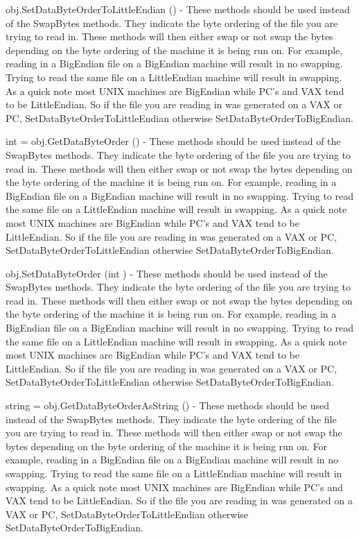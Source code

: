 \begin{DoxyItemize}
\item {\ttfamily obj.\-Set\-Data\-Byte\-Order\-To\-Little\-Endian ()} -\/ These methods should be used instead of the Swap\-Bytes methods. They indicate the byte ordering of the file you are trying to read in. These methods will then either swap or not swap the bytes depending on the byte ordering of the machine it is being run on. For example, reading in a Big\-Endian file on a Big\-Endian machine will result in no swapping. Trying to read the same file on a Little\-Endian machine will result in swapping. As a quick note most U\-N\-I\-X machines are Big\-Endian while P\-C's and V\-A\-X tend to be Little\-Endian. So if the file you are reading in was generated on a V\-A\-X or P\-C, Set\-Data\-Byte\-Order\-To\-Little\-Endian otherwise Set\-Data\-Byte\-Order\-To\-Big\-Endian.  
\item {\ttfamily int = obj.\-Get\-Data\-Byte\-Order ()} -\/ These methods should be used instead of the Swap\-Bytes methods. They indicate the byte ordering of the file you are trying to read in. These methods will then either swap or not swap the bytes depending on the byte ordering of the machine it is being run on. For example, reading in a Big\-Endian file on a Big\-Endian machine will result in no swapping. Trying to read the same file on a Little\-Endian machine will result in swapping. As a quick note most U\-N\-I\-X machines are Big\-Endian while P\-C's and V\-A\-X tend to be Little\-Endian. So if the file you are reading in was generated on a V\-A\-X or P\-C, Set\-Data\-Byte\-Order\-To\-Little\-Endian otherwise Set\-Data\-Byte\-Order\-To\-Big\-Endian.  
\item {\ttfamily obj.\-Set\-Data\-Byte\-Order (int )} -\/ These methods should be used instead of the Swap\-Bytes methods. They indicate the byte ordering of the file you are trying to read in. These methods will then either swap or not swap the bytes depending on the byte ordering of the machine it is being run on. For example, reading in a Big\-Endian file on a Big\-Endian machine will result in no swapping. Trying to read the same file on a Little\-Endian machine will result in swapping. As a quick note most U\-N\-I\-X machines are Big\-Endian while P\-C's and V\-A\-X tend to be Little\-Endian. So if the file you are reading in was generated on a V\-A\-X or P\-C, Set\-Data\-Byte\-Order\-To\-Little\-Endian otherwise Set\-Data\-Byte\-Order\-To\-Big\-Endian.  
\item {\ttfamily string = obj.\-Get\-Data\-Byte\-Order\-As\-String ()} -\/ These methods should be used instead of the Swap\-Bytes methods. They indicate the byte ordering of the file you are trying to read in. These methods will then either swap or not swap the bytes depending on the byte ordering of the machine it is being run on. For example, reading in a Big\-Endian file on a Big\-Endian machine will result in no swapping. Trying to read the same file on a Little\-Endian machine will result in swapping. As a quick note most U\-N\-I\-X machines are Big\-Endian while P\-C's and V\-A\-X tend to be Little\-Endian. So if the file you are reading in was generated on a V\-A\-X or P\-C, Set\-Data\-Byte\-Order\-To\-Little\-Endian otherwise Set\-Data\-Byte\-Order\-To\-Big\-Endian.  

\end{DoxyItemize}
